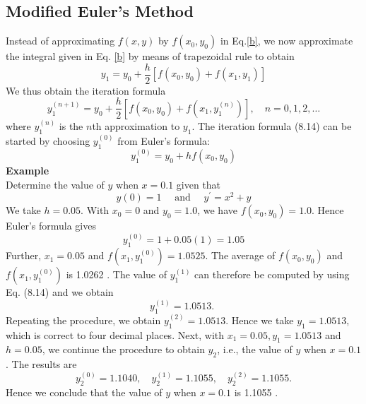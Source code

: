 \documentclass[12pt,a4paper,oneside]{book}
\begin{document}
\subsection{Modified Euler's Method}
Instead of approximating $f(x, y)$ by $f\left(x_0, y_0\right)$ in Eq.\ref{b}, we now approximate the integral given in Eq. \ref{b} by means of trapezoidal rule to obtain 
\begin{equation}\label{c}
	y_1=y_0+\frac{h}{2}\left[f\left(x_0, y_0\right)+f\left(x_1, y_1\right)\right]
\end{equation}
We thus obtain the iteration formula
$$
y_1^{(n+1)}=y_0+\frac{h}{2}\left[f\left(x_0, y_0\right)+f\left(x_1, y_1^{(n)}\right)\right], \quad n=0,1,2, \ldots
$$
where $y_1^{(n)}$ is the $n$th approximation to $y_1$. The iteration formula (8.14) can be started by choosing $y_1^{(0)}$ from Euler's formula:
$$
y_1^{(0)}=y_0+h f\left(x_0, y_0\right)
$$
\textbf{Example}\\
\vspace{.2cm}Determine the value of $y$ when $x=0.1$ given that $$ y(0)=1 \quad \text { and } \quad y^{\prime}=x^2+y $$ We take $h=0.05$. With $x_0=0$ and $y_0=1.0$, we have $f\left(x_0, y_0\right)=1.0$. Hence Euler's formula gives $$ y_1^{(0)}=1+0.05(1)=1.05 $$ Further, $x_1=0.05$ and $f\left(x_1, y_1^{(0)}\right)=1.0525$. The average of $f\left(x_0, y_0\right)$ and $f\left(x_1, y_1^{(0)}\right)$ is 1.0262 . The value of $y_1^{(1)}$ can therefore be computed by using Eq. (8.14) and we obtain $$ y_1^{(1)}=1.0513 \text {. } $$ Repeating the procedure, we obtain $y_1^{(2)}=1.0513$. Hence we take $y_1=1.0513$, which is correct to four decimal places. Next, with $x_1=0.05, y_1=1.0513$ and $h=0.05$, we continue the procedure to obtain $y_2$, i.e., the value of $y$ when $x=0.1$. The results are $$ y_2^{(0)}=1.1040, \quad y_2^{(1)}=1.1055, \quad y_2^{(2)}=1.1055 . $$ Hence we conclude that the value of $y$ when $x=0.1$ is 1.1055 .\\ \vspace{.2cm}
\end{document}
